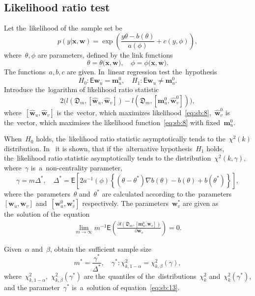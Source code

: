 \documentclass[
11pt,%
tightenlines,%
twoside,%
onecolumn,%
nofloats,%
nobibnotes,%
nofootinbib,%
superscriptaddress,%
noshowpacs,%
centertags]%
{revtex4}
\begin{document}
\subsection{Likelihood ratio test}\label{likelihood_test}
Let the~likelihood of the~sample set be
\[
\label{eq:sb:8}
	p(y|\mathbf{x},\mathbf{w}) = \exp\left(\frac{y\theta- b(\theta)}{a(\phi)} + c\left(y, \phi\right)\right),
\]
where~$\theta, \phi$ are parameters,  defined by the link functions 
\[
\label{eq:sb:8.1}
\theta=\theta\bigr(\mathbf{x},\mathbf{w}\bigr),\quad \phi=\phi\bigr(\mathbf{x},\mathbf{w}\bigr).
\] 
The functions~$a, b, c$ are given. In~linear regression test the~hypothesis
\[
\label{eq:sb:9}
	H_0: \mathsf{E}\mathbf{w}_{u} = \mathbf{m}^0_{u}, \quad H_1: \mathsf{E}\mathbf{w}_{u} \not= \mathbf{m}^0_{u}.
\]
Introduce the~logarithm of likelihood ratio statistic
 \[
\label{eq:sb:10}
	2\Big(l\left(\mathfrak{D}_m, [\hat{\mathbf{w}}_{u},\hat{\mathbf{w}}_{v}]\right) - l\left(\mathfrak{D}_m, [\mathbf{m}^{0}_{u},\hat{\mathbf{w}}^{0}_{v}]\right)\Big),
\]
where~$[\hat{\mathbf{w}}_{u},\hat{\mathbf{w}}_{v}]$ is the~vector, which maximizes likelihood~\eqref{eq:sb:8},~$\hat{\mathbf{w}}^{0}_{v}$ is the~vector, which maximises the likelihood function~\eqref{eq:sb:8} with fixed~$\mathbf{m}^{0}_{u}$.
	
When~$H_0$ holds, the~likelihood ratio statistic asymptotically tends to the~$\chi^2(k)$ distribution. In~\cite{shieh2000} it is shown, that if the~alternative hypothesis~$H_1$ holds, the~likelihood ratio statistic asymptotically tends to the distribution~$\chi^2(k,\gamma)$, where~$\gamma$ is~a~non-centrality parameter, 
\[
\label{eq:sb:11}
	\gamma = m\Delta^*, \quad \Delta^* = \mathsf{E}\left[2a^{-1}(\phi)\left\{\left(\theta - \theta^*\right)\nabla b(\theta) - b(\theta) + b(\theta^*)\right\}\right], 
\]
where the~parameters~$\theta$ and~$\theta^*$ are calculated according to the~parameters~$[\mathbf{w}_{u}, \mathbf{w}_{v}]$ and~$[\mathbf{w}^{0}_{u}, \mathbf{w}^{*}_{v}]$ respectively. The parameters~$\mathbf{w}^{*}_{v}$ are given as the~solution of the~equation
\[
\label{eq:sb:12}
\begin{aligned}
	\lim_{m\to\infty}m^{-1}\mathsf{E}\left(\frac{\partial l\left(\mathfrak{D}_m, \left[\mathbf{m}^{0}_{u}, \mathbf{w}_{v}\right]\right)}{\partial \mathbf{w}_{v}}\right) = 0.
\end{aligned}
\]
	
Given~$\alpha$ and~$\beta$, obtain the~sufficient sample size
\[
\label{eq:sb:13}
	m^* = \frac{\gamma^*}{\Delta^*}, \quad \gamma^*:\chi^2_{k, 1-\alpha} = \chi^2_{k, \beta}\left(\gamma\right), 
\]
where~$\chi^2_{k, 1-\alpha}$,~$\chi^2_{k, \beta}\left(\gamma^*\right)$ are the~quantiles of the~distributions~$\chi^{2}_k$ and~$\chi^2_{k}\left(\gamma^*\right)$, and the parameter~$\gamma^*$ is~a~solution of equation~\eqref{eq:sb:13}.
	
\end{document}
